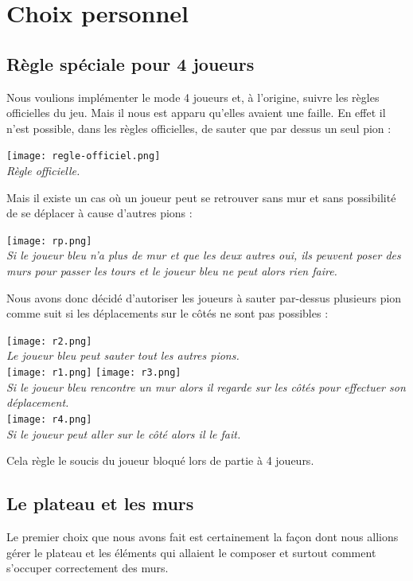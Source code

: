 \documentclass[a4paper, 12pt]{article}
\begin{document}
\section{Choix personnel}

\subsection{Règle spéciale pour 4 joueurs}
Nous voulions implémenter le mode 4 joueurs et, à l'origine, suivre les règles officielles du jeu. Mais il nous est apparu qu'elles avaient une faille. En effet il n'est possible, dans les règles officielles, de sauter que par dessus un seul pion :
\begin{center}
\texttt{[image: regle-officiel.png]} \\
\textit{Règle officielle.}
\end{center}

Mais il existe un cas où un joueur peut se retrouver sans mur et sans possibilité de se déplacer à cause d'autres pions :
\begin{center}
\texttt{[image: rp.png]} \\
\textit{Si le joueur bleu n'a plus de mur et que les deux autres oui, ils peuvent poser des murs pour passer les tours et le joueur bleu ne peut alors rien faire.}
\end{center}
Nous avons donc décidé d'autoriser les joueurs à sauter par-dessus plusieurs pion comme suit si les déplacements sur le côtés ne sont pas possibles :
\begin{center}
\texttt{[image: r2.png]} \\
\textit{Le joueur bleu peut sauter tout les autres pions.} \\
\texttt{[image: r1.png]}
\texttt{[image: r3.png]} \\
\textit{Si le joueur bleu rencontre un mur alors il regarde sur les côtés pour effectuer son déplacement.} \\
\texttt{[image: r4.png]} \\
\textit{Si le joueur peut aller sur le côté alors il le fait.}
\end{center}



Cela règle le soucis du joueur bloqué lors de partie  à 4 joueurs. 


\subsection{Le plateau et les murs}
Le premier choix que nous avons fait est certainement la façon dont nous allions gérer le plateau et les éléments qui allaient le composer et surtout comment s'occuper correctement
des murs. \\
\end{document}
